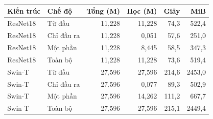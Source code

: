 \begin{tabular}{llrrrr}
\toprule
Kiến trúc & Chế độ & Tổng (M) & Học (M) & Giây & MiB \\
\midrule
ResNet18 & Từ đầu & 11,228 & 11,228 & 74,3 & 522,4 \\
ResNet18 & Chỉ đầu ra & 11,228 & 0,051 & 57,6 & 251,0 \\
ResNet18 & Một phần & 11,228 & 8,445 & 58,5 & 347,3 \\
ResNet18 & Toàn bộ & 11,228 & 11,228 & 73,6 & 519,4 \\
Swin-T & Từ đầu & 27,596 & 27,596 & 214,6 & 2453,0 \\
Swin-T & Chỉ đầu ra & 27,596 & 0,077 & 89,3 & 502,9 \\
Swin-T & Một phần & 27,596 & 14,262 & 111,2 & 667,7 \\
Swin-T & Toàn bộ & 27,596 & 27,596 & 215,1 & 2449,4 \\
\bottomrule
\end{tabular}
